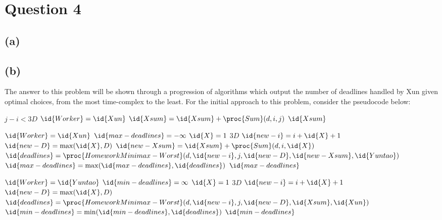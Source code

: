 \section{Question 4}
    \subsection{(a)}
    \subsection{(b)}
    The answer to this problem will be shown through a progression of algorithms which output the number of deadlines handled by Xun given optimal choices, from the most time-complex to the least.
    For the initial approach to this problem, consider the pseudocode below:
    \begin{spacing}{1.2}
        \begin{codebox}
            \li \If $j - i < 3D$
            \Then
                \li \If $\id{Worker} = \id{Xun}$
                \Then
                    \li $\id{Xsum} = \id{Xsum} + \proc{Sum}(d, i, j)$
                \End
                \li \Return $\id{Xsum}$
            \End

            \li \If $\id{Worker} = \id{Xun}$
            \Then
                \li $\id{max-deadlines} = -\infty$
                \li \For $\id{X} = 1$ \To $3D$
                \Do
                    \li $\id{new-i} = i + \id{X} + 1$
                    \li $\id{new-D} = \max(\id{X}, D)$
                    \li $\id{new-Xsum} = \id{Xsum} + \proc{Sum}(d, i, \id{X})$
                    \li $\id{deadlines} = \proc{HomeworkMinimax-Worst}(d, \id{new-i}, j,\id{new-D}, \id{new-Xsum}, \id{Yuntao})$
                    \li $\id{max-deadlines} = \max(\id{max-deadlines}, \id{deadlines})$
                \End
                \li \Return $\id{max-deadlines}$
            \End

            \li \If $\id{Worker} = \id{Yuntao}$
            \Then
                \li $\id{min-deadlines} = \infty$
                \li \For $\id{X} = 1$ \To $3D$
                \Do
                    \li $\id{new-i} = i + \id{X} + 1$
                    \li $\id{new-D} = \max(\id{X}, D)$
                    \li $\id{deadlines} = \proc{HomeworkMinimax-Worst}(d, \id{new-i}, j,\id{new-D}, \id{Xsum}, \id{Xun})$
                    \li $\id{min-deadlines} = \min(\id{min-deadlines}, \id{deadlines})$
                \End
                \li \Return $\id{min-deadlines}$
            \End
        \end{codebox}
    \end{spacing}
